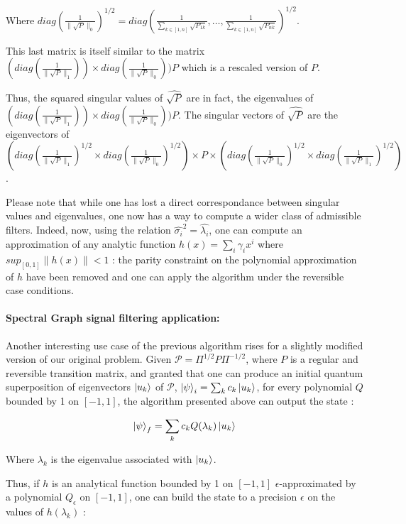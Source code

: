 \documentclass[sn-mathphys]{sn-jnl}%
\theoremstyle{thmstyleone}%
\theoremstyle{thmstyletwo}%
\theoremstyle{thmstylethree}%
\begin{document}
Where
$diag(\frac{1}{\|\sqrt{P}\|_0})^{1/2} = diag(\frac{1}{\sum_{k\in
    [1,n]} \sqrt{P_{1k}}}, \hdots, \frac{1}{\sum_{k\in [1,n]}
  \sqrt{P_{nk}}})^{1/2}$.

This last matrix is itself similar to the matrix
$(diag(\frac{1}{\|\sqrt{P}\|_1})) \times
diag(\frac{1}{\|\sqrt{P}\|_0})) P$ which is a rescaled version of $P$.

Thus, the squared singular values of $\widehat{\sqrt{P}}$ are in fact,
the eigenvalues of
$(diag(\frac{1}{\|\sqrt{P}\|_1})) \times
diag(\frac{1}{\|\sqrt{P}\|_0})) P$. The singular vectors of
$\widehat{\sqrt{P}}$ are the eigenvectors of
$(diag(\frac{1}{\|\sqrt{P}\|_1})^{1/2} \times
diag(\frac{1}{\|\sqrt{P}\|_0})^{1/2}) \times P \times
(diag(\frac{1}{\|\sqrt{P}\|_0})^{1/2} \times
diag(\frac{1}{\|\sqrt{P}\|_1})^{1/2})$.

Please note that while one has lost a direct correspondance between
singular values and eigenvalues, one now has a way to compute a wider
class of admissible filters. Indeed, now, using the relation
$\widehat{\sigma_i}^2 = \widehat{\lambda_i}$, one can compute an
approximation of any analytic function $h(x)=\sum_i \gamma_i x^i$
where $sup_{[0,1]} \|h(x)\| < 1$ : the parity
constraint on the polynomial approximation of $h$ have been removed
and one can apply the algorithm under the reversible case conditions.

\paragraph{Spectral Graph signal filtering application:}
Another interesting use case of the previous algorithm rises for a
slightly modified version of our original problem. Given
$\mathcal{P} = \Pi^{1/2} P \Pi^{-1/2}$, where $P$ is a regular and
reversible transition matrix, and granted that one can produce an
initial quantum superposition of eigenvectors $\ket{u_k}$ of
$\mathcal{P}$, $\ket{\psi}_i = \sum_k c_k \ket{u_k}$, for every
polynomial $Q$ bounded by 1 on $[-1,1]$, the algorithm presented above
can output the state :

\begin{equation}
    \ket{\psi}_f = \sum_k c_k Q(\lambda_k) \ket{u_k} 
\end{equation}
    
Where $\lambda_k$ is the eigenvalue associated with $\ket{u_k}$.

Thus, if $h$ is an analytical function bounded by 1 on $[-1,1]$
$\epsilon$-approximated by a polynomial $Q_\epsilon$ on $[-1,1]$, one
can build the state to a precision $\epsilon$ on the values of
$h(\lambda_k)$ :
\end{document}
